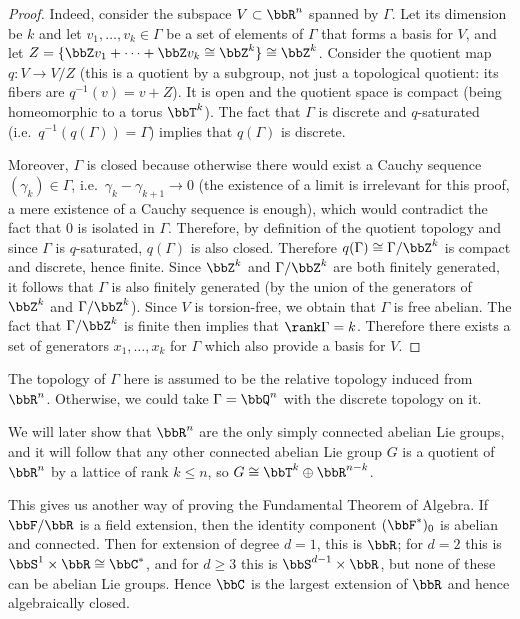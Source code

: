 \begin{proof}
    Indeed, consider the subspace $V\subset \bbR^n$ spanned by $\Gamma$. Let its dimension be $k$ and let $v_1,\ldots,v_k\in \Gamma$ be a set of elements of $\Gamma$ that forms a basis for $V$, and let $Z=\{\bbZ v_1+\cdots +\bbZ v_k\cong \bbZ^k\}\cong\bbZ^k$. Consider the quotient map $q:V\to V/Z$ (this is a quotient by a subgroup, not just a topological quotient: its fibers are $q^{-1}(v)=v+Z$). It is open and the quotient space is compact (being homeomorphic to a torus $\bbT^k$). The fact that $\Gamma$ is discrete and $q$-saturated (i.e.~$q^{-1}(q(\Gamma))=\Gamma$) implies that $q(\Gamma)$ is discrete. 
    
    Moreover, $\Gamma$ is closed because otherwise there would exist a Cauchy sequence $(\gamma_k)\in\Gamma$, i.e.~$\gamma_k-\gamma_{k+1}\to 0$ (the existence of a limit is irrelevant for this proof, a mere existence of a Cauchy sequence is enough), which would contradict the fact that $0$ is isolated in $\Gamma$. Therefore, by definition of the quotient topology and since $\Gamma$ is $q$-saturated, $q(\Gamma)$ is also closed.  Therefore $q(\Gamma)\cong \Gamma\slash \bbZ^k$ is compact and discrete, hence finite. Since $\bbZ^k$ and $\Gamma\slash \bbZ^k$ are both finitely generated, it follows that $\Gamma$ is also finitely generated (by the union of the generators of $\bbZ^k$ and $\Gamma\slash \bbZ^k$). Since $V$ is torsion-free, we obtain that $\Gamma$ is free abelian.  The fact that $\Gamma\slash \bbZ^k$ is finite then implies that $\rank \Gamma=k$. Therefore there exists a set of generators $x_1,\ldots,x_k$ for $\Gamma$ which also provide a basis for $V$.
\end{proof}

\begin{rem}
    The topology of $\Gamma$ here is assumed to be the relative topology induced from $\bbR^n$. Otherwise, we could take $\Gamma=\bbQ^n$ with the discrete topology on it.
\end{rem}

\begin{rem}
    We will later show that $\bbR^n$ are the only simply connected abelian Lie groups, and it will follow that any other connected abelian Lie group $G$ is a quotient of $\bbR^n$ by a lattice of rank $k\leq n$, so $G\cong \bbT^k\oplus \bbR^{n-k}$.
    
    This gives us another way of proving the Fundamental Theorem of Algebra. If $\bbF/\bbR$ is a field extension, then the identity component $(\bbF^\ast)_0$ is abelian and connected. Then for extension of degree $d=1$, this is $\bbR$; for $d=2$ this is $\bbS^1\times\bbR\cong\bbC^\ast$, and for $d\geq 3$ this is $\bbS^{d-1}\times\bbR$, but none of these can be abelian Lie groups. Hence $\bbC$ is the largest extension of $\bbR$ and hence algebraically closed.
\end{rem}





